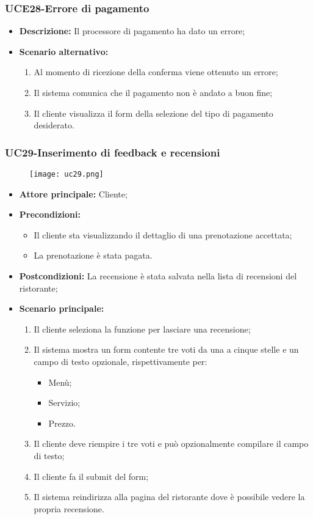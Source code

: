 \subsubsection{UCE28-Errore di pagamento}
\begin{itemize}
\item \textbf{Descrizione:} Il processore di pagamento ha dato un errore;
\item \textbf{Scenario alternativo:}
\begin{enumerate}
    \item Al momento di ricezione della conferma viene ottenuto un errore;
    \item Il sistema comunica che il pagamento non è andato a buon fine;
    \item Il cliente visualizza il form della selezione del tipo di pagamento desiderato.
\end{enumerate}
\end{itemize}

\subsubsection{UC29-Inserimento di feedback e recensioni}
\begin{figure}[h] \texttt{[image: uc29.png]} \end{figure}
\begin{itemize}
\item \textbf{Attore principale:} Cliente;
\item \textbf{Precondizioni:}
  \begin{itemize}
    \item Il cliente sta visualizzando il dettaglio di una prenotazione accettata;
    \item La prenotazione è stata pagata.
  \end{itemize}
\item \textbf{Postcondizioni:} La recensione è stata salvata nella lista di recensioni del ristorante;
\item \textbf{Scenario principale:}
\begin{enumerate}
    \item Il cliente seleziona la funzione per lasciare una recensione;
    \item Il sistema mostra un form contente tre voti da una a cinque stelle e un campo di testo opzionale, rispettivamente per:
  \begin{itemize}
    \item Menù;
    \item Servizio;
    \item Prezzo.
  \end{itemize}
    \item Il cliente deve riempire i tre voti e può opzionalmente compilare il campo di testo;
    \item Il cliente fa il submit del form;
    \item Il sistema reindirizza alla pagina del ristorante dove è possibile vedere la propria recensione.
\end{enumerate}
\end{itemize}

